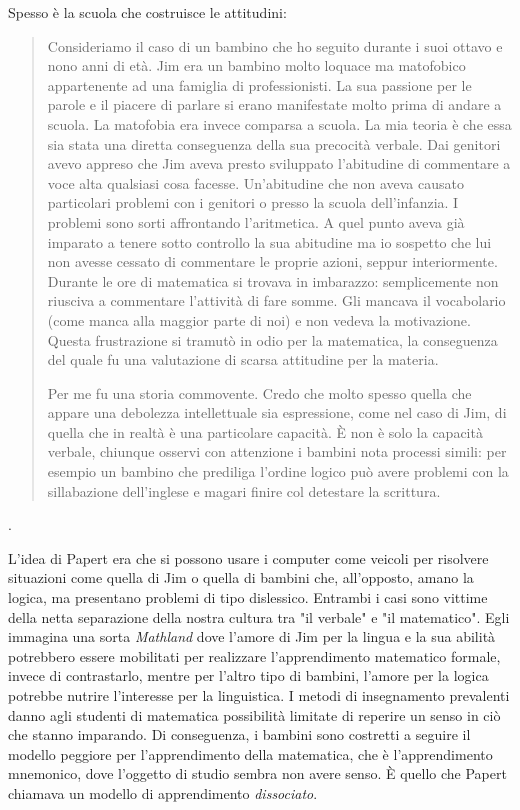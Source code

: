 Spesso è la scuola che costruisce le attitudini:

\begin{quote}
Consideriamo il caso di un bambino  che ho seguito durante i suoi ottavo e nono anni di età. Jim era un bambino molto loquace ma matofobico appartenente ad una famiglia di professionisti. La sua passione per le parole e il piacere di parlare si erano manifestate molto prima di andare a scuola. La matofobia era invece comparsa a scuola. La mia teoria è che essa sia stata una diretta conseguenza della sua precocità verbale. Dai genitori avevo appreso che Jim aveva presto sviluppato l'abitudine di commentare a voce alta qualsiasi cosa facesse. Un'abitudine che non aveva causato particolari problemi con i genitori o presso la scuola dell'infanzia. I problemi sono sorti affrontando l'aritmetica. A quel punto aveva già imparato a tenere sotto controllo la sua abitudine ma io sospetto che lui non avesse cessato di commentare le proprie azioni, seppur interiormente. Durante le ore di matematica si trovava in imbarazzo: semplicemente non riusciva a commentare l'attività di fare somme. Gli mancava il vocabolario (come manca alla maggior parte di noi) e non vedeva la motivazione. Questa frustrazione si tramutò in odio per la matematica, la conseguenza del quale fu una valutazione di scarsa attitudine per la materia. 

Per me fu una storia commovente. Credo che molto spesso quella che appare una debolezza intellettuale sia espressione, come nel caso di Jim, di quella che in realtà è una particolare capacità. È non è solo la capacità verbale, chiunque osservi con attenzione i bambini nota processi simili: per esempio un bambino che prediliga l'ordine logico può avere problemi con la sillabazione dell'inglese e magari finire col detestare la scrittura.
\end{quote}.

L'idea di Papert era che si possono usare i computer come veicoli per risolvere situazioni come quella di Jim o quella di bambini che, all'opposto, amano la logica, ma presentano problemi di tipo dislessico. Entrambi i casi sono vittime della netta separazione della nostra cultura tra "il verbale" e "il matematico". Egli immagina una sorta \textit{Mathland} dove l'amore di Jim per la lingua e la sua abilità potrebbero essere mobilitati per realizzare l'apprendimento matematico formale, invece di contrastarlo, mentre per l'altro tipo di bambini, l'amore per la logica potrebbe nutrire l'interesse per la linguistica. I metodi di insegnamento prevalenti danno agli studenti di matematica possibilità limitate di reperire un senso in ciò che stanno imparando. Di conseguenza, i bambini sono costretti a seguire il modello peggiore per l'apprendimento della matematica, che è l'apprendimento mnemonico, dove l'oggetto di studio sembra non avere senso. È quello che Papert chiamava un modello di apprendimento \textit{dissociato}.

